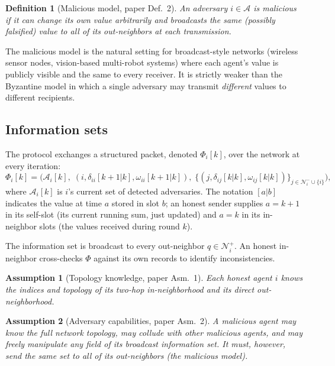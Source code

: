 \documentclass[journal]{IEEEtran}
\newtheorem{definition}{Definition}
\newtheorem{assumption}{Assumption}
\newcommand{\NN}{\mathcal{N}}
\newcommand{\AA}{\mathcal{A}}
\begin{document}
\begin{definition}[Malicious model, paper Def.~2]
An adversary $i\in\AA$ is \emph{malicious} if it can change its own value
arbitrarily and broadcasts the same (possibly falsified) value to all of
its out-neighbors at each transmission.
\end{definition}

The malicious model is the natural setting for broadcast-style networks
(wireless sensor nodes, vision-based multi-robot systems) where each agent's
value is publicly visible and the same to every receiver.  It is strictly
weaker than the Byzantine model in which a single adversary may transmit
\emph{different} values to different recipients.

\subsection{Information sets}
The protocol exchanges a structured packet, denoted $\Phi_i[k]$, over the
network at every iteration:
\begin{equation}
\label{eq:phi}
\Phi_i[k] = \Big( \AA_i[k],\; (i, \delta_{ii}[k\!+\!1|k], \omega_{ii}[k\!+\!1|k]),
\;\{(j, \delta_{ij}[k|k], \omega_{ij}[k|k])\}_{j\in\NN_i^-\cup\{i\}} \Big),
\end{equation}
where $\AA_i[k]$ is $i$'s current set of detected adversaries.  The notation
$[a|b]$ indicates the value at time $a$ stored in slot $b$; an honest sender
supplies $a=k\!+\!1$ in its self-slot (its current running sum, just updated)
and $a=k$ in its in-neighbor slots (the values received during round $k$).

The information set is broadcast to every out-neighbor $q\in\NN_i^+$.  An
honest in-neighbor cross-checks $\Phi$ against its own records to identify
inconsistencies.

\begin{assumption}[Topology knowledge, paper Asm.~1]
Each honest agent $i$ knows the indices and topology of its two-hop
in-neighborhood and its direct out-neighborhood.
\end{assumption}

\begin{assumption}[Adversary capabilities, paper Asm.~2]
A malicious agent may know the full network topology, may collude with other
malicious agents, and may freely manipulate any field of its broadcast
information set.  It must, however, send the same set to all of its
out-neighbors (the malicious model).
\end{assumption}
\end{document}
